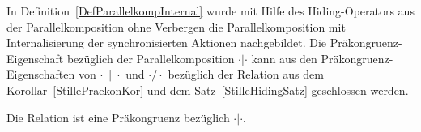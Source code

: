 In Definition~\ref{DefParallelkompInternal} wurde mit Hilfe des
Hiding-Operators aus der Parallelkomposition ohne Verbergen die
Parallelkomposition mit Internalisierung der synchronisierten Aktionen
nachgebildet. Die Präkongruenz-Eigenschaft bezüglich \QRel{} der
Parallelkomposition $\cdot |\cdot$ kann aus den Präkongruenz-Eigenschaften von
$\cdot\|\cdot$ und $\cdot /\cdot$ bezüglich der Relation \QRel{} aus dem
Korollar~\ref{StillePraekonKor} und dem Satz~\ref{StilleHidingSatz} geschlossen
werden.

\begin{Kor}
  Die Relation \QRel{} ist eine Präkongruenz bezüglich $\cdot |\cdot$.
\end{Kor}
